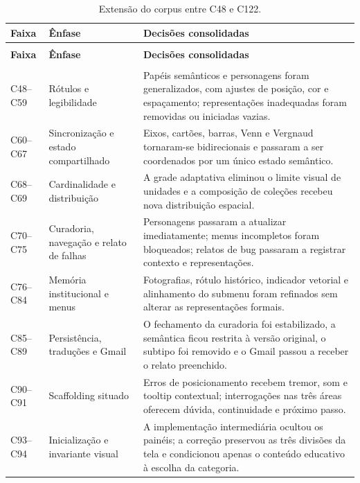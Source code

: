 \documentclass[preprint,12pt,authoryear]{elsarticle}
\begin{document}


\begingroup
\small
\setlength{\tabcolsep}{3pt}
\begin{longtable}{@{}>{\raggedright\arraybackslash}p{2.55cm}>{\raggedright\arraybackslash}p{3.1cm}>{\raggedright\arraybackslash}p{8.35cm}@{}}
\caption{Extensão do corpus entre C48 e C122.}
\label{tab:extensao-c48-c98}\\
\toprule
\textbf{Faixa} & \textbf{Ênfase} & \textbf{Decisões consolidadas}\\
\midrule
\endfirsthead
\multicolumn{3}{c}{\tablename\ \thetable{} -- continuação}\\
\toprule
\textbf{Faixa} & \textbf{Ênfase} & \textbf{Decisões consolidadas}\\
\midrule
\endhead
\midrule
\multicolumn{3}{r}{Continua na próxima página}\\
\endfoot
\bottomrule
\endlastfoot
C48--C59 & Rótulos e legibilidade & Papéis semânticos e personagens foram generalizados, com ajustes de posição, cor e espaçamento; representações inadequadas foram removidas ou iniciadas vazias.\\
C60--C67 & Sincronização e estado compartilhado & Eixos, cartões, barras, Venn e Vergnaud tornaram-se bidirecionais e passaram a ser coordenados por um único estado semântico.\\
C68--C69 & Cardinalidade e distribuição & A grade adaptativa eliminou o limite visual de unidades e a composição de coleções recebeu nova distribuição espacial.\\
C70--C75 & Curadoria, navegação e relato de falhas & Personagens passaram a atualizar imediatamente; menus incompletos foram bloqueados; relatos de bug passaram a registrar contexto e representações.\\
C76--C84 & Memória institucional e menus & Fotografias, rótulo histórico, indicador vetorial e alinhamento do submenu foram refinados sem alterar as representações formais.\\
C85--C89 & Persistência, traduções e Gmail & O fechamento da curadoria foi estabilizado, a semântica ficou restrita à versão original, o subtipo foi removido e o Gmail passou a receber o relato preenchido.\\
C90--C91 & Scaffolding situado & Erros de posicionamento recebem tremor, som e tooltip contextual; interrogações nas três áreas oferecem dúvida, continuidade e próximo passo.\\
C93--C94 & Inicialização e invariante visual & A implementação intermediária ocultou os painéis; a correção preservou as três divisões da tela e condicionou apenas o conteúdo educativo à escolha da categoria.\\

\end{longtable}
\end{document}
